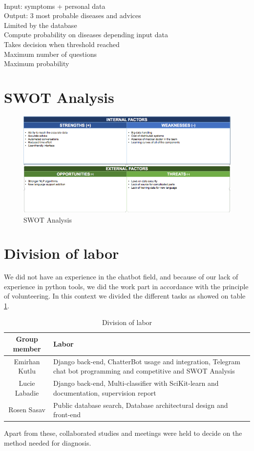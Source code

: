 \paragraph{}
Input: symptoms + personal data \\
Output: 3 most probable diseases and advices \\
Limited by the database \\
Compute probability on diseases depending input data \\
Takes decision when threshold reached \\
Maximum number of questions \\
Maximum probability 


\section{SWOT Analysis}

\begin{figure}[H]
	\centering
	\includegraphics[width=\textwidth]{swot}
	\caption{SWOT Analysis}
	\label{swot}
\end{figure}

\section{Division of labor}

We did not have an experience in the chatbot field, and because of our lack of experience in python	tools, we did the work part in accordance with the principle of volunteering. In this context we divided the different tasks as showed on table \ref{labor}.
\begin{table}[H]
	\centering
	\begin{tabular}{|c|p{10cm}|}
		\hline
		\textbf{Group member} & \textbf{Labor} \\
		\hline
		Emirhan	Kutlu & Django back-end, ChatterBot usage and integration, Telegram chat bot programming and competitive and SWOT Analysis \\
		\hline
		Lucie Labadie & Django back-end, Multi-classifier with SciKit-learn and documentation, supervision report \\
		\hline
		Rosen Sasav & Public database search, Database architectural design and front-end \\
		\hline
	\end{tabular}
	\caption{Division of labor}
	\label{labor}
\end{table}	

Apart from these, collaborated studies and meetings	were held to decide on the method needed for diagnosis.